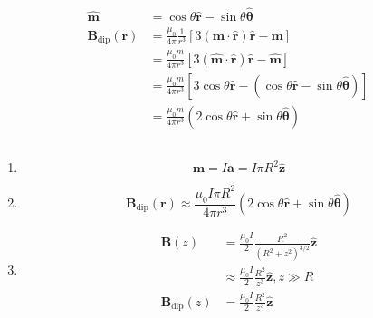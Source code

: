 \documentclass{article}
\renewcommand{\vec}[1]{\boldsymbol{\mathbf{#1}}}
\newcommand{\uvec}[1]{\hat{\vec{#1}}}
\begin{document}
\setcounter{subsection}{33}
\subsection{}

\begin{align*}
  \uvec{m}                    & = \cos \theta \uvec{r} - \sin \theta \uvec{\theta}                                                        \\
  \vec{B}_\text{dip}(\vec{r}) & = \frac{\mu_0}{4 \pi} \frac{1}{r^3} [3 (\vec{m} \cdot \uvec{r}) \uvec{r} - \vec{m}]                       \\
                              & = \frac{\mu_0 m}{4 \pi r^3} [3 (\uvec{m} \cdot \uvec{r}) \uvec{r} - \uvec{m}]                             \\
                              & = \frac{\mu_0 m}{4 \pi r^3} [3 \cos \theta \uvec{r} - (\cos \theta \uvec{r} - \sin \theta \uvec{\theta})] \\
                              & = \frac{\mu_0 m}{4 \pi r^3} (2 \cos \theta \uvec{r} + \sin \theta \uvec{\theta})
\end{align*}

\subsection{}

\begin{enumerate}
  \item \[\vec{m} = I \vec{a} = I \pi R^2 \uvec{z}\]

  \item \[\vec{B}_\text{dip}(\vec{r}) \approx \frac{\mu_0 I \pi R^2}{4 \pi r^3} (2 \cos \theta \uvec{r} + \sin \theta \uvec{\theta})\]

  \item

        \begin{align*}
          \vec{B}(z)            & = \frac{\mu_0 I}{2} \frac{R^2}{(R^2 + z^2)^{3 / 2}} \uvec{z} \\
                                & \approx \frac{\mu_0 I}{2} \frac{R^2}{z^3} \uvec{z}, z \gg R  \\
          \vec{B}_\text{dip}(z) & = \frac{\mu_0 I}{2} \frac{R^2}{z^3} \uvec{z}
        \end{align*}
\end{enumerate}

\subsection{}
\end{document}
